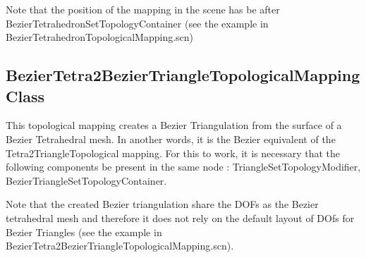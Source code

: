 \documentclass[a4paper,11pt]{article}
\begin{document}
Note that the position of the mapping in the scene has be after BezierTetrahedronSetTopologyContainer (see the example in BezierTetrahedronTopologicalMapping.scn) 

\subsection{BezierTetra2BezierTriangleTopologicalMapping Class}

This topological mapping creates a Bezier Triangulation from the surface of a Bezier Tetrahedral mesh. In another words, it is the Bezier equivalent of the Tetra2TriangleTopological mapping. For this to work, it is necessary that the following components be present in the same node : TriangleSetTopologyModifier, BezierTriangleSetTopologyContainer. 

Note that the created Bezier triangulation share the DOFs as the Bezier tetrahedral mesh and therefore it does not rely on the default layout of DOfs for Bezier Triangles (see the example in BezierTetra2BezierTriangleTopologicalMapping.scn). 
\end{document}
